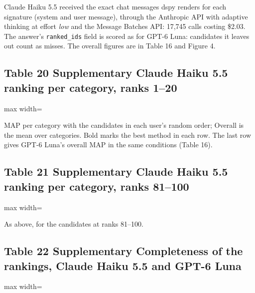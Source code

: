 \documentclass[10pt]{article}
\begin{document}
Claude Haiku 5.5 received the exact chat messages dspy renders for each signature (system and user message), through the Anthropic API with adaptive thinking at effort \emph{low} and the Message Batches API: 17,745 calls costing \$2.03. The answer's \texttt{ranked\_ids} field is scored as for GPT-6 Luna: candidates it leaves out count as misses. The overall figures are in Table 16 and Figure 4.

\subsection*{Table 20 \textperiodcentered{} Supplementary \textperiodcentered{} Claude Haiku 5.5 ranking per category, ranks 1--20}
\begin{center}\begin{adjustbox}{max width=\linewidth}

\end{adjustbox}\end{center}

{\small MAP per category with the candidates in each user's random order; Overall is the mean over categories. Bold marks the best method in each row. The last row gives GPT-6 Luna's overall MAP in the same conditions (Table 16).}

\subsection*{Table 21 \textperiodcentered{} Supplementary \textperiodcentered{} Claude Haiku 5.5 ranking per category, ranks 81--100}
\begin{center}\begin{adjustbox}{max width=\linewidth}

\end{adjustbox}\end{center}

{\small As above, for the candidates at ranks 81--100.}

\subsection*{Table 22 \textperiodcentered{} Supplementary \textperiodcentered{} Completeness of the rankings, Claude Haiku 5.5 and GPT-6 Luna}
\begin{center}\begin{adjustbox}{max width=\linewidth}

\end{adjustbox}\end{center}
\end{document}
